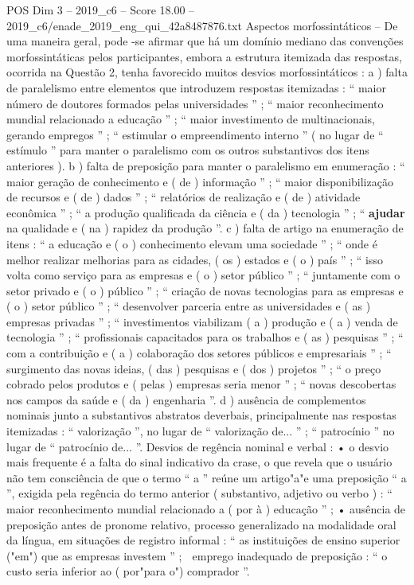 \begin{textsample}{POS Dim 3 – 2019\_c6 – Score 18.00 – 2019\_c6/enade\_2019\_eng\_qui\_42a8487876.txt}
Aspectos morfossintáticos – De uma maneira geral, pode -se afirmar que há um domínio mediano das convenções morfossintáticas pelos participantes, embora a estrutura itemizada das respostas, ocorrida na Questão 2, tenha favorecido muitos desvios morfossintáticos : a ) falta de paralelismo entre elementos que introduzem respostas itemizadas : “ maior número de doutores formados pelas universidades ” ; “ maior reconhecimento mundial relacionado a educação ” ; “ maior investimento de multinacionais, gerando empregos ” ; “ estimular o empreendimento interno ” ( no lugar de “ estímulo ” para manter o paralelismo com os outros substantivos dos itens anteriores ). b ) falta de preposição para manter o paralelismo em enumeração : “ maior geração de conhecimento e ( de ) informação ” ; “ maior disponibilização de recursos e ( de ) dados ” ; “ relatórios de realização e ( de ) atividade econômica ” ; “ a produção qualificada da ciência e ( da ) tecnologia ” ; “ \textbf{ajudar} na qualidade e ( na ) rapidez da produção ”. c ) falta de artigo na enumeração de itens : “ a educação e ( o ) conhecimento elevam uma sociedade ” ; “ onde é melhor realizar melhorias para as cidades, ( os ) estados e ( o ) país ” ; “ isso volta como serviço para as empresas e ( o ) setor público ” ; “ juntamente com o setor privado e ( o ) público ” ; “ criação de novas tecnologias para as empresas e ( o ) setor público ” ; “ desenvolver parceria entre as universidades e ( as ) empresas privadas ” ; “ investimentos viabilizam ( a ) produção e ( a ) venda de tecnologia ” ; “ profissionais capacitados para os trabalhos e ( as ) pesquisas ” ; “ com a contribuição e ( a ) colaboração dos setores públicos e empresariais ” ; “ surgimento das novas ideias, ( das ) pesquisas e ( dos ) projetos ” ; “ o preço cobrado pelos produtos e ( pelas ) empresas seria menor ” ; “ novas descobertas nos campos da saúde e ( da ) engenharia ”. d ) ausência de complementos nominais junto a substantivos abstratos deverbais, principalmente nas respostas itemizadas : “ valorização ”, no lugar de “ valorização de... ” ; “ patrocínio ” no lugar de “ patrocínio de... ”.
Desvios de regência nominal e verbal : • o desvio mais frequente é a falta do sinal indicativo da crase, o que revela que o usuário não tem consciência de que o termo “ a ” reúne um artigo"a"e uma preposição “ a ”, exigida pela regência do termo anterior ( substantivo, adjetivo ou verbo ) : “ maior reconhecimento mundial relacionado a ( por à ) educação ” ; • ausência de preposição antes de pronome relativo, processo generalizado na modalidade oral da língua, em situações de registro informal : “ as instituições de ensino superior ("em") que as empresas investem ” ;  emprego inadequado de preposição : “ o custo seria inferior ao ( por"para o") comprador ”.

\end{textsample}
